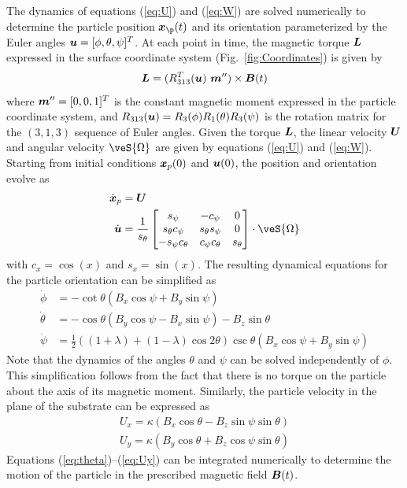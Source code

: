 The dynamics of equations (\ref{eq:U}) and (\ref{eq:W}) are solved numerically to determine the particle position $\ve{x}_{\p}(t)$ and its orientation parameterized by the Euler angles  $\boldsymbol{u}=[\phi,\theta,\psi]^T$. At each point in time, the magnetic torque $\boldsymbol{L}$ expressed in the surface coordinate system (Fig.~\ref{fig:Coordinates}) is given by 
\begin{equation}
    \boldsymbol{L} = (R_{313}^{T}(\boldsymbol{u})~\boldsymbol{m}'')\times \boldsymbol{B}(t) \label{eq:Lm}
\end{equation}
where $\boldsymbol{m}''=[0,0,1]^T$ is the constant magnetic moment expressed in the particle coordinate system, and $R_{313}(\boldsymbol{u})=R_3(\phi)R_1(\theta)R_3(\psi)$ is the rotation matrix for the $(3,1,3)$ sequence of Euler angles.\autocite{diebel2006representing} Given the torque $\boldsymbol{L}$, the linear velocity $\boldsymbol{U}$ and angular velocity $\veS{\Omega}$ are given by equations (\ref{eq:U}) and (\ref{eq:W}). Starting from initial conditions $\boldsymbol{x}_p(0)$ and $\boldsymbol{u}(0)$, the position and orientation evolve as 
\begin{align}
    \dot{\ve{x}}_p &= \ve{U} \label{eq:position}
    \\
    \dot{\ve{u}} &= \frac{1}{s_{\theta}}\begin{bmatrix} 
     s_{\psi} & -c_{\psi} & 0
     \\
     s_{\theta} c_{\psi} & s_{\theta} s_{\psi} & 0
     \\
     -s_{\psi}c_{\theta} & c_{\psi}c_{\theta} & s_{\theta}
     \end{bmatrix} \cdot \veS{\Omega}
\end{align}
with $c_x =\cos(x)$ and $s_x=\sin(x)$.\autocite{diebel2006representing} The resulting dynamical equations for the particle orientation can be simplified as
\begin{align}
    \dot{\phi} &= -\cot \theta (B_x\cos\psi +B_y\sin\psi)
    \\
    \dot{\theta} &=  -\cos\theta (B_y \cos\psi - B_x \sin\psi) - B_z\sin\theta \label{eq:theta}
    \\
    \dot{\psi} &= \tfrac{1}{2} \left((1+\lambda) +(1-\lambda)\cos2\theta \right) \csc\theta (B_x \cos \psi + B_y\sin\psi ) \label{eq:psi}
\end{align}
Note that the dynamics of the angles $\theta$ and $\psi$ can be solved independently of $\phi$.  This simplification follows from the fact that there is no torque on the particle about the axis of its magnetic moment. Similarly, the particle velocity in the plane of the substrate can be expressed as
\begin{align}
    U_x = \kappa (B_x \cos \theta -  B_z \sin \psi \sin\theta) \label{eq:Ux}
    \\
    U_y = \kappa (B_y \cos\theta + B_z \cos\psi \sin\theta ) \label{eq:Uy}
\end{align}
Equations (\ref{eq:theta})--(\ref{eq:Uy}) can be integrated numerically to determine the motion of the particle in the prescribed magnetic field $\boldsymbol{B}(t)$.


